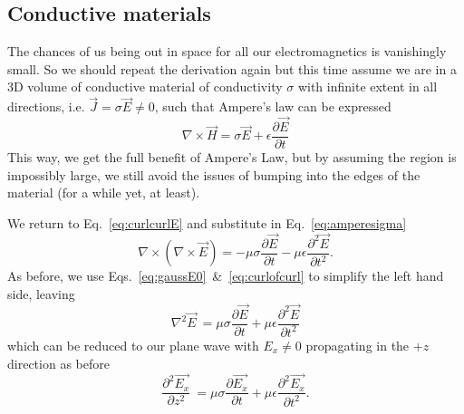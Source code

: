 \documentclass{tufte-handout}
\begin{document}
\subsection{Conductive materials}
The chances of us being out in space for all our electromagnetics is vanishingly small. So we should repeat the derivation again but this time assume we are in a 3D volume of conductive material of conductivity $\sigma$ with infinite extent in all directions, i.e. $\vec{J} = \sigma\vec{E} \neq0$, such that Ampere's law can be expressed
\begin{equation}
\nabla\times\vec{H} = \sigma\vec{E} + \epsilon\frac{\partial\vec{E}}{\partial t} \label{eq:amperesigma}
\end{equation}
 This way, we get the full benefit of Ampere's Law, but by assuming the region is impossibly large, we still avoid the issues of bumping into the edges of the material (for a while yet, at least).

We return to Eq.~\ref{eq:curlcurlE} and substitute in Eq.~\ref{eq:amperesigma}\marginnote{\[ \nabla\times\left(\nabla\times\vec{E}\right) = \nabla\times\left(-\mu\frac{\partial \vec{H}}{\partial t} \right)\]}
\begin{equation}
\nabla\times\left(\nabla\times\vec{E}\right) = -\mu\sigma\frac{\partial \vec{E}}{\partial t}  -\mu\epsilon \frac{\partial^2\vec{E}}{\partial t^2}.
\end{equation}
As before, we use Eqs.~\ref{eq:gaussE0}~\&~\ref{eq:curlofcurl} to simplify the left hand side, leaving
\begin{equation}
\nabla^2\vec{E}\ = \mu\sigma\frac{\partial \vec{E}}{\partial t}  +\mu\epsilon \frac{\partial^2\vec{E}}{\partial t^2}\label{eq:diffEfull}
\end{equation}
which can be reduced to our plane wave with $E_x\neq0$ propagating in the $+z$ direction as before 
\begin{equation}
\frac{\partial^2\vec{E_x}}{\partial z^2}\ = \mu\sigma\frac{\partial \vec{E_x}}{\partial t}  +\mu\epsilon \frac{\partial^2\vec{E_x}}{\partial t^2}.
\label{eq:diffEfullx}
\end{equation}
\end{document}
